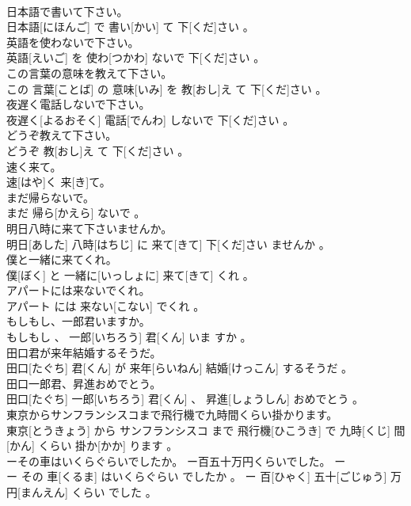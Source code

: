 \documentclass[8pt]{extreport}
\begin{document}
\begin{CJK}{UTF8}{min}
\\	日本語で書いて下さい。	
\\	日本語[にほんご] で 書い[かい] て 下[くだ]さい 。
\\	英語を使わないで下さい。	
\\	英語[えいご] を 使わ[つかわ] ないで 下[くだ]さい 。
\\	この言葉の意味を教えて下さい。	
\\	この 言葉[ことば] の 意味[いみ] を 教[おし]え て 下[くだ]さい 。
\\	夜遅く電話しないで下さい。	
\\	夜遅く[よるおそく] 電話[でんわ] しないで 下[くだ]さい 。
\\	どうぞ教えて下さい。	
\\	どうぞ 教[おし]え て 下[くだ]さい 。
\\	速く来て。	
\\	速[はや]く 来[き]て。
\\	まだ帰らないで。	
\\	まだ 帰ら[かえら] ないで 。
\\	明日八時に来て下さいませんか。	
\\	明日[あした] 八時[はちじ] に 来て[きて] 下[くだ]さい ませんか 。
\\	僕と一緒に来てくれ。	
\\	僕[ぼく] と 一緒に[いっしょに] 来て[きて] くれ 。
\\	アパートには来ないでくれ。	
\\	アパート には 来ない[こない] でくれ 。
\\	もしもし、一郎君いますか。	
\\	もしもし 、 一郎[いちろう] 君[くん] いま すか 。
\\	田口君が来年結婚するそうだ。	
\\	田口[たぐち] 君[くん] が 来年[らいねん] 結婚[けっこん] するそうだ 。
\\	田口一郎君、昇進おめでとう。	
\\	田口[たぐち] 一郎[いちろう] 君[くん] 、 昇進[しょうしん] おめでとう 。
\\	東京からサンフランシスコまで飛行機で九時間くらい掛かります。	
\\	東京[とうきょう] から サンフランシスコ まで 飛行機[ひこうき] で 九時[くじ] 間[かん] くらい 掛か[かか] ります 。
\\	ーその車はいくらぐらいでしたか。 ー百五十万円くらいでした。	ー
\\	ー その 車[くるま] はいくらぐらい でしたか 。 ー 百[ひゃく] 五十[ごじゅう] 万円[まんえん] くらい でした 。

\end{CJK}
\end{document}
